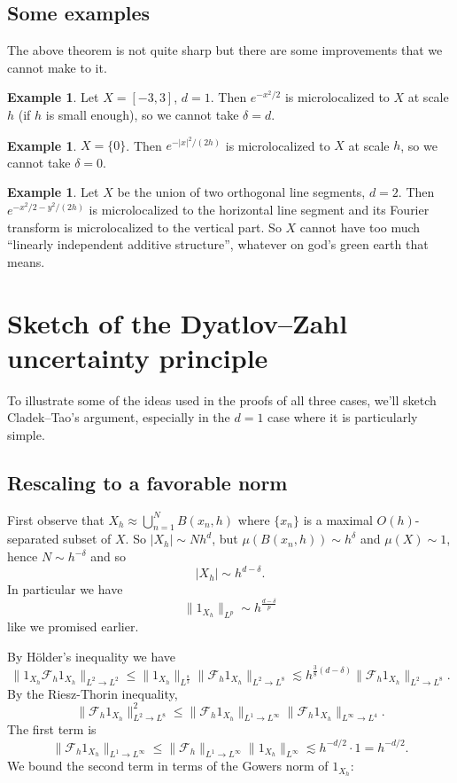 \documentclass[reqno,12pt]{amsart}
\theoremstyle{definition}
\newtheorem{example}[theorem]{Example}
\numberwithin{equation}{section}
\begin{document}
\subsection{Some examples}
The above theorem is not quite sharp but there are some improvements that we cannot make to it.

\begin{example}
    Let $X = [-3, 3]$, $d = 1$. Then $e^{-x^2/2}$ is microlocalized to $X$ at scale $h$ (if $h$ is small enough), so we cannot take $\delta = d$.
\end{example}

\begin{example}
    $X = \{0\}$. Then $e^{-|x|^2/(2h)}$ is microlocalized to $X$ at scale $h$, so we cannot take $\delta = 0$.
\end{example}

\begin{example}
    Let $X$ be the union of two orthogonal line segments, $d = 2$.
    Then $e^{-x^2/2-y^2/(2h)}$ is microlocalized to the horizontal line segment and its Fourier transform is microlocalized to the vertical part.
    So $X$ cannot have too much ``linearly independent additive structure'', whatever on god's green earth that means.
\end{example}

\section{Sketch of the Dyatlov--Zahl uncertainty principle}
To illustrate some of the ideas used in the proofs of all three cases, we'll sketch Cladek--Tao's argument, especially in the $d = 1$ case where it is particularly simple.

\subsection{Rescaling to a favorable norm}
First observe that $X_h \approx \bigcup_{n = 1}^N B(x_n, h)$ where $\{x_n\}$ is a maximal $O(h)$-separated subset of $X$.
So $|X_h| \sim Nh^d$, but $\mu(B(x_n, h)) \sim h^\delta$ and $\mu(X) \sim 1$, hence $N \sim h^{-\delta}$ and so 
$$|X_h| \sim h^{d - \delta}.$$
In particular we have 
$$\|1_{X_h}\|_{L^p} \sim h^{\frac{d - \delta}{p}}$$
like we promised earlier.

By H\"older's inequality we have 
$$\|1_{X_h} \mathscr F_h 1_{X_h}\|_{L^2 \to L^2} \leq \|1_{X_h}\|_{L^{\frac{8}{3}}} \|\mathscr F_h 1_{X_h}\|_{L^2 \to L^8} \lesssim h^{\frac{3}{8}(d - \delta)} \|\mathscr F_h 1_{X_h}\|_{L^2 \to L^8}.$$
By the Riesz-Thorin inequality,
$$\|\mathscr F_h 1_{X_h}\|_{L^2 \to L^8}^2 \leq \|\mathscr F_h 1_{X_h}\|_{L^1 \to L^\infty} \|\mathscr F_h 1_{X_h}\|_{L^\infty \to L^4}.$$
The first term is 
$$\|\mathscr F_h 1_{X_h}\|_{L^1 \to L^\infty} \leq \|\mathscr F_h\|_{L^1 \to L^\infty} \|1_{X_h}\|_{L^\infty} \lesssim h^{-d/2} \cdot 1 = h^{-d/2}.$$
We bound the second term in terms of the Gowers norm of $1_{X_h}$:
\end{document}
